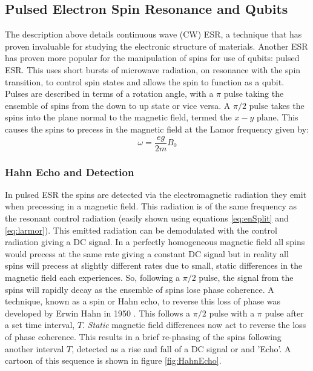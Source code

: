 \subsection{Pulsed Electron Spin Resonance and Qubits}
The description above details continuous wave (CW) ESR, a technique that has proven invaluable for studying the electronic structure of materials.
Another ESR has proven more popular for the manipulation of spins for use of qubits: pulsed ESR.
This uses short bursts of microwave radiation, on resonance with the spin transition, to control spin states and allows the spin to function as a qubit.
Pulses are described in terms of a rotation angle, with a $\pi$ pulse taking  the ensemble of spins from the down to up state or vice versa. 
A $\pi/2$ pulse takes the spins into the plane normal to the magnetic field, termed the $x-y$ plane. 
This causes the spins to precess in the magnetic field at the Lamor frequency given by:
\begin{equation}
\label{eq:larmor}
\omega = \frac{eg}{2m}B_0
\end{equation}

\subsubsection{Hahn Echo and Detection}

In pulsed ESR the spins are detected via the electromagnetic radiation they emit when precessing in a magnetic field. 
This radiation is of the same frequency as the resonant control radiation (easily shown using equations \ref{eq:enSplit} and \ref{eq:larmor}).
This emitted radiation can be demodulated with the control radiation giving a DC signal.
In a perfectly homogeneous magnetic field all spins would precess at the same rate giving a constant DC signal but in reality all spins will precess at slightly different rates due to small, static differences in the magnetic field each experiences.
So, following a $\pi/2$ pulse, the signal from the spins will rapidly decay as the ensemble of spins lose phase coherence. 
A technique, known as a spin or Hahn echo, to reverse this loss of phase was developed by Erwin Hahn in 1950 \cite{hahn1950}. 
This follows a $\pi/2$ pulse with a $\pi$ pulse after a set time interval, $T$. 
\textit{Static} magnetic field differences now act to reverse the loss of phase coherence. 
This results in a brief re-phasing of the spins following another interval $T$, detected as a rise and fall of a DC signal or and 'Echo'.
A cartoon of this sequence is shown in figure \ref{fig:HahnEcho}. 

